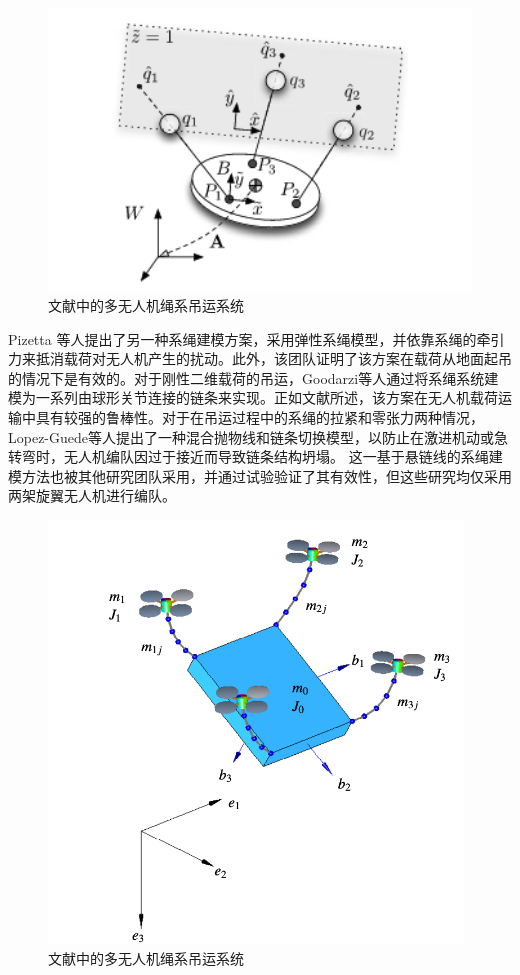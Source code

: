\documentclass[lang=chs, degree=master, blindreview=true, winfonts=true]{yanputhesis}
\begin{document}
\begin{figure}[hbt!]
	\centering
	\includegraphics[width=28pc]{picture/1_5.png} 
	\caption{文献中的多无人机绳系吊运系统} \label{1_5}
\end{figure}

Pizetta 等人\cite{pizetta2019avoiding}提出了另一种系绳建模方案，采用弹性系绳模型，并依靠系绳的牵引力来抵消载荷对无人机产生的扰动\cite{pizetta2019avoiding}。此外，该团队证明了该方案在载荷从地面起吊的情况下是有效的。对于刚性二维载荷的吊运，Goodarzi等人\cite{c2016stabilization}通过将系绳系统建模为一系列由球形关节连接的链条来实现。正如文献所述，该方案在无人机载荷运输中具有较强的鲁棒性。对于在吊运过程中的系绳的拉紧和零张力两种情况，Lopez-Guede等人\cite{estevez2022hybrid}提出了一种混合抛物线和链条切换模型，以防止在激进机动或急转弯时，无人机编队因过于接近而导致链条结构坍塌。
这一基于悬链线的系绳建模方法也被其他研究团队\cite{d2021catenary,abhishek2021towards}采用，并通过试验验证了其有效性，但这些研究均仅采用两架旋翼无人机进行编队。
\begin{figure}[hbt!]
	\centering
	\includegraphics[width=26pc]{picture/1_6.png} 
	\caption{文献中的多无人机绳系吊运系统} \label{1_6}
\end{figure}
\end{document}
